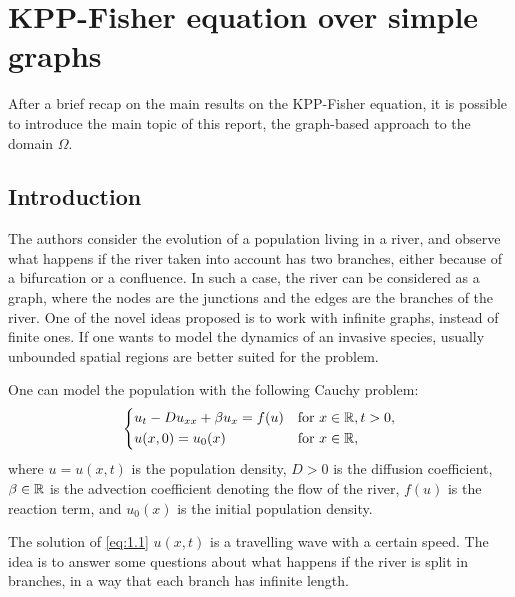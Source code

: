 \section{KPP-Fisher equation over simple graphs}
After a brief recap on the main results on the KPP-Fisher equation, it is possible to introduce the main topic of this report, the graph-based approach to the domain \(\Omega\). 
\subsection{Introduction}
The authors consider the evolution of a population living in a river, and observe what happens if the river taken into account has two branches, either because of a bifurcation or a confluence. In such a case, the river can be considered as a graph, where the nodes are the junctions and the edges are the branches of the river. One of the novel ideas proposed is to work with infinite graphs, instead of finite ones. If one wants to model the dynamics of an invasive species, usually unbounded spatial regions are better suited for the problem.

One can model the population with the following Cauchy problem:
\begin{equation}
    \begin{dcases}
        u_t - Du_{xx} + \beta u_x = f(u) & \text{for } x \in \mathbb{R}, t > 0, \\
        u(x, 0) = u_0(x) & \text{for } x \in \mathbb{R},
    \end{dcases}
    \label{eq:1.1}
\end{equation}
where \(u = u(x, t)\) is the population density, \(D > 0\) is the diffusion coefficient, \(\beta \in \mathbb{R}\) is the advection coefficient denoting the flow of the river, \(f(u)\) is the reaction term, and \(u_0(x)\) is the initial population density.

The solution of \eqref{eq:1.1} \(u(x, t)\) is a travelling wave with a certain speed. The idea is to answer some questions about what happens if the river is split in branches, in a way that each branch has infinite length. 

